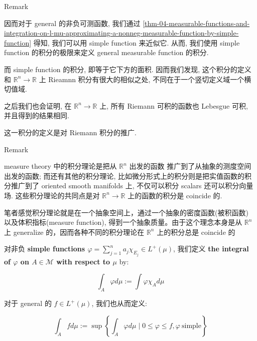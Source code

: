 \begin{qlremark}{Remark}

因而对于 general 的非负可测函数, 我们通过 \ref{thm-04-measurable-functions-and-integration-on-l-mu-approximating-a-nonneg-measurable-function-by-simple-function} 得知, 我们可以用 simple function 来近似它. 从而, 我们使用 simple function 的积分的极限来定义 general measurable function 的积分.

而 simple function 的积分, 即等于它下方的面积. 因而我们发现, 这个积分的定义和 \(\mathbb{R}^{n}\rightarrow\mathbb{R}\) 上 Rieamnn 积分有很大的相似之处, 不同在于一个竖切定义域一个横切值域.

之后我们也会证明, 在 \(\mathbb{R}^{n}\rightarrow\mathbb{R}\) 上, 所有 Riemann 可积的函数也 Lebesgue 可积, 并且得到的结果相同.

这一积分的定义是对 Riemann 积分的推广.

\end{qlremark}

\begin{qlremark}{Remark}

measure theory 中的积分理论是把从 \(\mathbb{R}^{n}\) 出发的函数 推广到了从抽象的测度空间出发的函数; 而还有其他的积分理论, 比如微分形式上的积分则是把实值函数的积分推广到了 oriented smooth manifolds 上, 不仅可以积分 scalars 还可以积分向量场. 这些积分理论的共同点是对 \(\mathbb{R}^{n}\rightarrow\mathbb{R}\) 上的函数的积分是 coincide 的.

笔者感觉积分理论就是在一个抽象空间上，通过一个抽象的密度函数(被积函数) 以及体积指标(measure function), 得到一个抽象质量。由于这个理念本身是从 \(\mathbb{R}^{n}\) 上 generalize 的，因而各种不同的积分理论在 \(\mathbb{R}^{n}\) 上的积分总是 coincide 的

\end{qlremark}

\begin{definition}{}

对非负 \textbf{simple functions \(\varphi = \sum_{j = 1}^{n}a_{j}\chi_{E_{j}} \in L^{+}(\mu)\)}, 我们定义 \textbf{the integral of \(\varphi\) on \(A \in \mathcal{M}\) with respect to \(\mu\)} by:

\[\int_{A}\varphi d\mu := \int\varphi\chi_{A} d\mu\]

对于 general 的 \(f \in L^{+}(\mu)\), 我们也从而定义:

\[\int_{A}fd\mu := \sup\left\{ {\int_{A}\varphi d\mu \mid 0 \leq \varphi \leq f,\varphi\ \text{simple}} \right\}\]

\end{definition}


